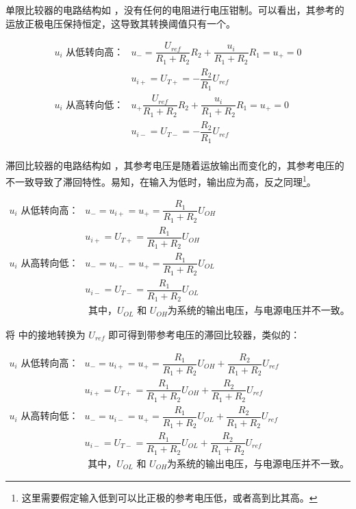 \documentclass[lang=cn,11pt,a4paper,cite=authoryear]{elegantpaper}
\begin{document}


单限比较器的电路结构如  ，没有任何的电阻进行电压钳制。可以看出，其参考的运放正极电压保持恒定，这导致其转换阈值只有一个。

\[
\begin{aligned}
    u_i \text{ 从低转向高：} & u_{-} = \dfrac{U_{ref}}{R_1 + R_2} R_2 + \dfrac{u_{i}}{R_1 + R_2} R_1 = u_{+} = 0\\  
    & u_{i+} = U_{T+} = -\dfrac{R_2}{R_1} U_{ref}\\ 
    u_i \text{ 从高转向低：} & u_{+} \dfrac{U_{ref}}{R_1 + R_2} R_2 + \dfrac{u_{i}}{R_1 + R_2} R_1 = u_{+} = 0\\ 
    & u_{i-} = U_{T-} = -\dfrac{R_2}{R_1} U_{ref}\\ 
\end{aligned}    
\]


滞回比较器的电路结构如  ，其参考电压是随着运放输出而变化的，其参考电压的不一致导致了滞回特性。易知，在输入为低时，输出应为高，反之同理\footnote{这里需要假定输入低到可以比正极的参考电压低，或者高到比其高。}。


\[
\begin{aligned}
    u_i \text{ 从低转向高：} & u_{-} = u_{i+} = u_{+} = \dfrac{R_1}{R_1 + R_2} U_{OH}\\  
    & u_{i+} = U_{T+} = \dfrac{R_1}{R_1 + R_2} U_{OH} \\ 
    u_i \text{ 从高转向低：} &  u_{-} = u_{i-} = u_{+} = \dfrac{R_1}{R_1 + R_2} U_{OL}\\ 
    & u_{i-} = U_{T-} = \dfrac{R_1}{R_1 + R_2} U_{OL} \\ 
    & \text{ 其中，} U_{OL} \text{ 和 } U_{OH} \text{为系统的输出电压，与电源电压并不一致。}
\end{aligned}    
\]


将  中的接地转换为 \(U_{ref}\) 即可得到带参考电压的滞回比较器，类似的：

\[
\begin{aligned}
    u_i \text{ 从低转向高：} & u_{-} = u_{i+} = u_{+} = \dfrac{R_1}{R_1 + R_2} U_{OH} + \dfrac{R_2}{R_1 + R_2} U_{ref}\\  
    & u_{i+} = U_{T+} = \dfrac{R_1}{R_1 + R_2} U_{OH}  + \dfrac{R_2}{R_1 + R_2} U_{ref}\\ 
    u_i \text{ 从高转向低：} &  u_{-} = u_{i-} = u_{+} = \dfrac{R_1}{R_1 + R_2} U_{OL} + \dfrac{R_2}{R_1 + R_2} U_{ref}\\ 
    & u_{i-} = U_{T-} = \dfrac{R_1}{R_1 + R_2} U_{OL}  + \dfrac{R_2}{R_1 + R_2} U_{ref}\\ 
    & \text{ 其中，} U_{OL} \text{ 和 } U_{OH} \text{为系统的输出电压，与电源电压并不一致。}
\end{aligned}    
\]
\end{document}
